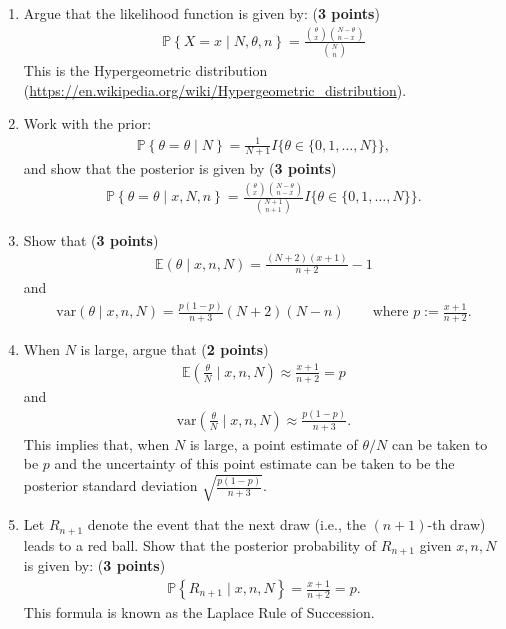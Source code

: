 \documentclass{scrartcl}
\newcommand{\E}{{\mathbb E}}
\renewcommand{\P}{{\mathbb P}}
\def\qt#1{\qquad\text{#1}}
\begin{document}
\begin{enumerate}
  \begin{enumerate}
  \item Argue that the likelihood function is given by: (\textbf{3 points})
    \begin{align*}
      \P \left\{X = x \mid N, \theta, n \right\} = \frac{{\theta
      \choose x}{N - \theta \choose n-x}}{{N \choose n}}
    \end{align*}
  This is the Hypergeometric distribution
  (\url{https://en.wikipedia.org/wiki/Hypergeometric_distribution}).  
  \item Work with the prior:
    \begin{align*}
      \P \left\{\theta = \theta \mid N \right\} = \frac{1}{N+1}
      I\{\theta \in \{0, 1, \dots, N\}\}, 
    \end{align*}
    and show that the posterior is given by (\textbf{3 points})
    \begin{align*}
      \P \left\{\theta = \theta \mid x, N, n \right\} = \frac{{\theta
      \choose x} {N - \theta \choose n - x}}{{N+1
      \choose n+1}} I\{\theta \in \{0, 1, \dots, N\}\}. 
    \end{align*}
  \item Show that (\textbf{3 points})
    \begin{align*}
      \E \left(\theta \mid x, n, N \right) = \frac{(N+2)(x+1)}{n+2} - 1
    \end{align*}
    and
    \begin{align*}
      \text{var}(\theta \mid x, n, N) = \frac{p(1 - p)}{n+3}(N+2)(N-n)
      \qt{where $p := \frac{x + 1}{n+2}$}. 
    \end{align*}
  \item When $N$ is large, argue that (\textbf{2 points})
    \begin{align*}
      \E \left(\frac{\theta}{N} \mid x, n, N \right) \approx
      \frac{x+1}{n+2} = p
    \end{align*}
    and
    \begin{align*}
      \text{var}\left(\frac{\theta}{N} \mid x, n, N \right) \approx
      \frac{p(1-p)}{n+3}. 
    \end{align*}
    This implies that, when $N$ is large, a point estimate of $\theta/N$ can be taken to
    be $p$ and the uncertainty of this point estimate can be taken to
    be the posterior standard deviation $\sqrt{\frac{p(1-p)}{n+3}}$.
  \item Let $R_{n+1}$ denote the event that the next draw (i.e., the
    $(n+1)$-th draw) leads to a red ball. Show that the posterior
    probability of $R_{n+1}$ given $x, n, N$ is given by: (\textbf{3 points})
    \begin{align*}
      \P \left\{R_{n+1} \mid x, n, N \right\} = \frac{x+1}{n+2} = p. 
    \end{align*}
    This formula is known as the Laplace Rule of Succession. 
  \end{enumerate}


\end{enumerate}
\end{document}
